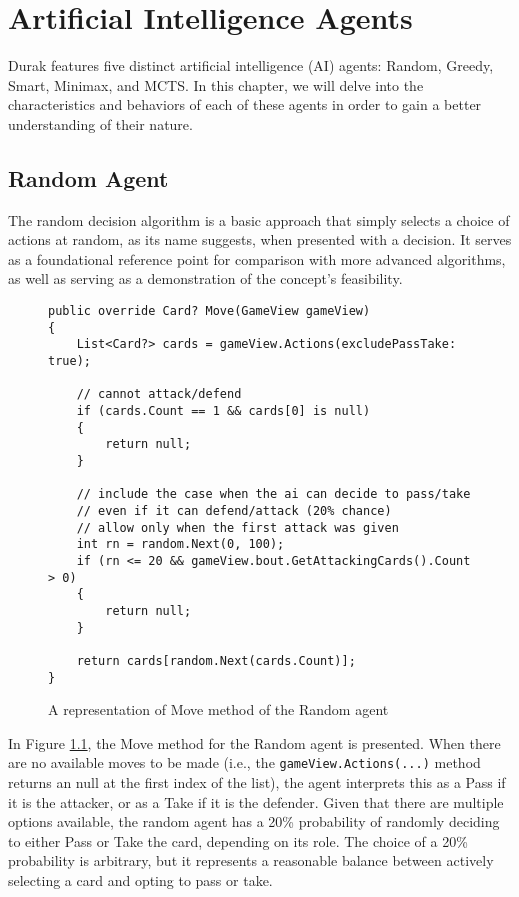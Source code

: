 \chapter{Artificial Intelligence Agents}
\label{AIAgents}

Durak features five distinct artificial intelligence (AI) agents: Random, Greedy, Smart, Minimax, and MCTS. In this chapter, we will delve into the characteristics and behaviors of each of these agents in order to gain a better understanding of their nature. 

\section{Random Agent}
The random decision algorithm is a basic approach that simply selects a choice of actions at random, as its name suggests, when presented with a decision. It serves as a foundational reference point for comparison with more advanced algorithms, as well as serving as a demonstration of the concept's feasibility. 

\begin{figure}[h]
\captionsetup{justification=centering}
\begin{lstlisting}[frame=single]
public override Card? Move(GameView gameView)
{
    List<Card?> cards = gameView.Actions(excludePassTake: true);

    // cannot attack/defend
    if (cards.Count == 1 && cards[0] is null)
    {
        return null;
    }

    // include the case when the ai can decide to pass/take
    // even if it can defend/attack (20% chance)
    // allow only when the first attack was given
    int rn = random.Next(0, 100);
    if (rn <= 20 && gameView.bout.GetAttackingCards().Count > 0)
    {
        return null;
    }

    return cards[random.Next(cards.Count)];
}
\end{lstlisting}
\caption{A representation of Move method of the Random agent}
\label{fig:randomMove}
\end{figure}

In Figure \ref{fig:randomMove}, the Move method for the Random agent is presented. When there are no available moves to be made (i.e., the \texttt{gameView.Actions(...)} method returns an null at the first index of the list), the agent interprets this as a Pass if it is the attacker, or as a Take if it is the defender. Given that there are multiple options available, the random agent has a 20\% probability of randomly deciding to either Pass or Take the card, depending on its role. The choice of a 20\% probability is arbitrary, but it represents a reasonable balance between actively selecting a card and opting to pass or take.


